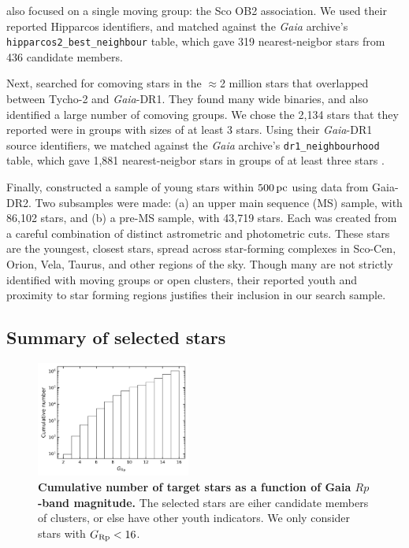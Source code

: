 \documentclass[12pt,twocolumn,tighten]{aastex62}
\begin{document}
\citet{rizzuto_multidimensional_2011} also focused on a single moving
group: the Sco OB2 association. We used their reported Hipparcos
identifiers, and matched against the {\it Gaia} archive's
\texttt{hipparcos2\_best\_neighbour} table, which gave 319
nearest-neigbor stars from 436 candidate members.

Next, \citet{oh_comoving_2017} searched for comoving stars in the
$\approx$2 million stars that overlapped between Tycho-2 and {\it
Gaia}-DR1.  They found many wide binaries, and also identified a large
number of comoving groups.  We chose the 2{,}134 stars that they
reported were in groups with sizes of at least 3 stars.  Using their
{\it Gaia}-DR1 source identifiers, we matched against the {\it Gaia}
archive's \texttt{dr1\_neighbourhood} table, which gave 1{,}881
nearest-neigbor stars in groups of at least three stars
\citep{marrese_gaia_2019}.

Finally, \citet{zari_3d_2018} constructed a sample of young stars
within $500\,{\rm pc}$ using data from Gaia-DR2. Two subsamples were
made: (a) an upper main sequence (MS) sample, with 86{,}102 stars, and
(b) a pre-MS sample, with 43{,}719 stars.  Each was created from a
careful combination of distinct astrometric and photometric cuts.
These stars are the youngest, closest stars, spread across
star-forming complexes in Sco-Cen, Orion, Vela, Taurus, and other
regions of the sky.  Though many are not strictly identified with
moving groups or open clusters, their reported youth and proximity to star
forming regions justifies their inclusion in our search sample.


\subsection{Summary of selected stars}
\label{subsec:ocmgsummary}

\begin{figure}[t]
	\begin{center}
		\leavevmode
		\includegraphics[width=0.45\textwidth]{target_star_cumulative_counts.png}
	\end{center}
	\vspace{-0.2cm}
	\caption{
    {\bf Cumulative number of target stars as
    a function of Gaia $Rp$-band magnitude.}  The selected stars are eiher candidate
    members of clusters, or else have other youth indicators. We only consider stars
    with $G_{\rm Rp} < 16$.
	\label{fig:cdips_targets}
	}
\end{figure}
\end{document}

